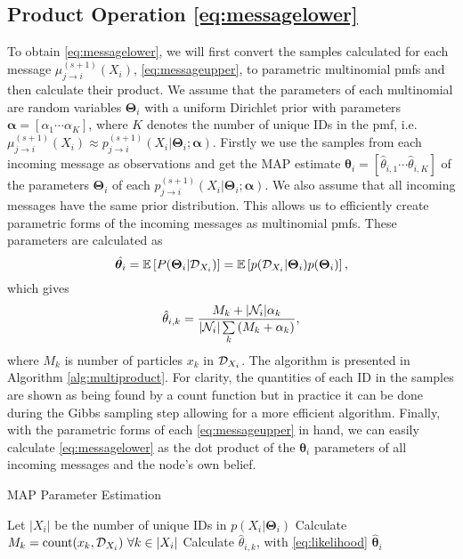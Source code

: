 \documentclass[10pt, final, journal]{IEEEtran}
\begin{document}
\subsection{Product Operation \eqref{eq:messagelower}}\label{productoperation}
To obtain \eqref{eq:messagelower}, we will first convert the samples calculated for each message  $\mu^{(s+1)}_{j \rightarrow i}(X_{i})$,  \eqref{eq:messageupper}, to parametric multinomial pmfs and then calculate their product. We assume that the parameters of each multinomial are random variables $\bm \Theta_i$  with a uniform Dirichlet prior with parameters $\bm \alpha =[\alpha_1 \cdots \alpha_K]$, where $K$ denotes the number of unique IDs in the pmf, i.e. $\mu^{(s+1)}_{j \rightarrow i}(X_{i})\approx p^{(s+1)}_{j \rightarrow i}(X_{i}|\bm \Theta_i; \bm \alpha  ) $.  Firstly we use the samples from each incoming message as observations and get the MAP estimate $ \hat{\bm\theta}_i=[\hat{\theta}_{i,1}\cdots \hat{\theta}_{i,K}]$ of the parameters $\bm \Theta_i$  of each $p^{(s+1)}_{j \rightarrow i}(X_{i}|\bm \Theta_i; \bm \alpha  ) $. We also assume that all incoming messages have the same prior distribution. This allows us to efficiently create parametric forms of the incoming messages as multinomial pmfs. These parameters are calculated as
\begin{equation}
\hat{\bm\theta_i}= {\mathbb E}\left[P(\bm\Theta_i | {\cal D}_{X_i})\right]= {\mathbb E} \left[p({\cal D}_{X_i}| \bm\Theta_i)p(\bm\Theta_i)\right],
\end{equation}
which gives
\begin{equation}\label{eq:likelihood}
\hat{\theta}_{i,k}=\frac{M_{k}+| {\cal N}_i | \alpha_{k}}{| {\cal N}_i |\sum\limits_{k}\left(M_{k}+\alpha_{k}\right)},
\end{equation}
where $M_{k}$ is number of particles $x_k $ in ${\cal D}_{X_i}$. The algorithm is presented in Algorithm \ref{alg:multiproduct}. For clarity, the quantities of each ID in the samples are shown as being found by a count function but in practice it can be done during the Gibbs sampling step allowing for a more efficient algorithm. Finally, with the parametric forms of each \eqref{eq:messageupper} in hand, we can easily calculate \eqref{eq:messagelower} as the dot product of the $\bm \theta_i$ parameters of all incoming messages and the node's own belief.

\begin{algorithm}
\caption{MAP Parameter Estimation}
\begin{algorithmic}[1]
\label{alg:multiproduct}
\STATE Let $|X_{i}|$ be the number of unique IDs in $p( X_{i}|\bm\Theta_{i})$
\STATE Calculate  $M_{k}={\rm count}( x_{k}, {\cal D}_{ X_{i}} ) ~\forall k \in | X_{i}|$
\STATE Calculate $\hat{\theta}_{i,k}$, with \eqref{eq:likelihood}
\ENDFOR
\RETURN$ {\hat{\bm \theta}_{i}} $
\end{algorithmic}
\end{algorithm}
\end{document}
